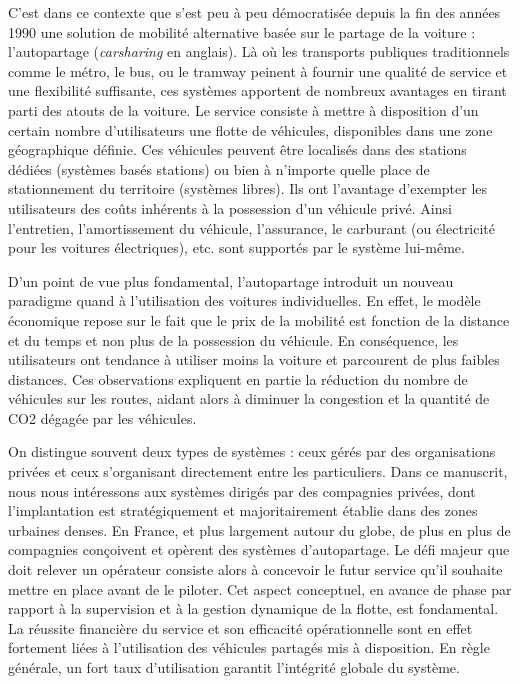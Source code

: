 \medskip
C'est dans ce contexte que s'est peu à peu démocratisée depuis la fin des années 1990 une solution de mobilité alternative basée sur le partage de la voiture : l'autopartage (\emph{carsharing} en anglais).
Là où les transports publiques traditionnels comme le métro, le bus, ou le tramway peinent à fournir une qualité de service et une flexibilité suffisante, ces systèmes apportent de nombreux avantages en tirant parti des atouts de la voiture.
Le service consiste à mettre à disposition d'un certain nombre d'utilisateurs une flotte de véhicules, disponibles dans une zone géographique définie.
Ces véhicules peuvent être localisés dans des stations dédiées (systèmes basés stations) ou bien à n'importe quelle place de stationnement du territoire (systèmes libres).
Ils ont l'avantage d'exempter les utilisateurs des coûts inhérents à la possession d'un véhicule privé.
Ainsi l'entretien, l'amortissement du véhicule, l'assurance, le carburant (ou électricité pour les voitures électriques), etc. sont supportés par le système lui-même.

\medskip
D'un point de vue plus fondamental, l'autopartage introduit un nouveau paradigme quand à l'utilisation des voitures individuelles.
En effet, le modèle économique repose sur le fait que le prix de la mobilité est fonction de la distance et du temps et non plus de la possession du véhicule.
En conséquence, les utilisateurs ont tendance à utiliser moins la voiture et parcourent de plus faibles distances.
Ces observations expliquent en partie la réduction du nombre de véhicules sur les routes, aidant alors à diminuer la congestion et la quantité de CO2 dégagée par les véhicules.

\medskip
On distingue souvent deux types de systèmes : ceux gérés par des organisations privées et ceux s'organisant directement entre les particuliers.
Dans ce manuscrit, nous nous intéressons aux systèmes dirigés par des compagnies privées, dont l'implantation est stratégiquement et majoritairement établie dans des zones urbaines denses.
En France, et plus largement autour du globe, de plus en plus de compagnies conçoivent et opèrent des systèmes d'autopartage.
Le défi majeur que doit relever un opérateur consiste alors à concevoir le futur service qu’il souhaite mettre en place avant de le piloter.
Cet aspect conceptuel, en avance de phase par rapport à la supervision et à la gestion dynamique de la flotte, est fondamental.
La réussite financière du service et son efficacité opérationnelle sont en effet fortement liées à l’utilisation des véhicules partagés mis à disposition.
En règle générale, un fort taux d’utilisation garantit l’intégrité globale du système.

